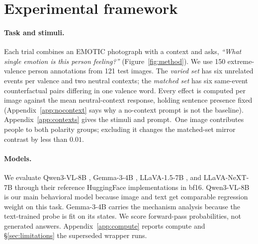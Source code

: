 \documentclass{article}
\newif\ifshort
\newcommand{\gemma}{Gemma-3-4B}
\newcommand{\qwen}{Qwen3-VL-8B}
\newcommand{\llava}{LLaVA-1.5-7B}
\newcommand{\llavanext}{LLaVA-NeXT-7B}
\begin{document}
\section{Experimental framework}
\label{sec:setup}


\paragraph{Task and stimuli.}
Each trial combines an EMOTIC photograph with a context and asks, \emph{``What single emotion is this person feeling?''} (Figure~\ref{fig:method}). We use 150 extreme-valence person annotations from 121 test images. The \emph{varied set} has six unrelated events per valence and two neutral contexts; the \emph{matched set} has six same-event counterfactual pairs differing in one valence word. Every effect is computed per image against the mean neutral-context response, holding sentence presence fixed (Appendix~\ref{app:nocontext} says why a no-context prompt is not the baseline). Appendix~\ref{app:contexts} gives the stimuli and prompt.\ifshort\else\ One image contributes people to both polarity groups; excluding it changes the matched-set mirror contrast by less than $0.01$.\fi

\paragraph{Models.}
We evaluate \qwen{} \citep{qwen3vl}, \gemma{} \citep{gemma3}, \llava{} \citep{llava15}, and \llavanext{} \citep{llavanext} through their reference HuggingFace implementations \citep{wolf2020} in bf16. \qwen{} is our main behavioral model because image and text get comparable regression weight on this task. \gemma{} carries the mechanism analysis because the text-trained probe is fit on its states. We score forward-pass probabilities, not generated answers. Appendix~\ref{app:compute} reports compute and \S\ref{sec:limitations} the superseded wrapper runs.
\end{document}
